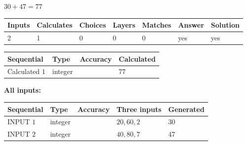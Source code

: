 \documentclass[12pt]{article}
\begin{document}
 
\noindent{}
 
 

 
 
 
\noindent{}
 
 

$ %
30 +  %
47=   %
77$
 
 
\noindent{}
 
 

 
   
   
   
   
\noindent\begin{tabular}{|l|l|l|l|l|l|l|}
 \hline
Inputs & Calculates & Choices & Layers & Matches & Answer & Solution \\ \hline
 2  & 
 1  & 
 0
  & 
 0  & 
 0  & 
  yes & 
  yes 
  \\ \hline
 \end{tabular}
   
   
   
   
\noindent{}
   
   
  
  
\noindent\begin{tabular}{|l|l|l|l|}
\hline
 Sequential & Type & Accuracy & Calculated \\ 
\hline
 
 
  Calculated $  1 $ & integer &  & 
  $ 77 $ 
 \\  \hline  
 \end{tabular}
   
   
   
   
\noindent\vspace{0.1in}\hspace{-0.08in} {\textbf{\Large{All inputs: }}}
   
   
  
  
\noindent\begin{tabular}{|l|l|l|l|l|}
\hline
 Sequential & Type & Accuracy & Three inputs & Generated \\ 
\hline
 
 
  INPUT $  1 $ & integer &  & $
 20
 , 
 60
 , 
 2
 $ & $ 30 $ 
 \\  \hline  
 
 
  INPUT $  2 $ & integer &  & $
 40
 , 
 80
 , 
 7
 $ & $ 47 $ 
 \\  \hline  
 \end{tabular}
   
\end{document}
